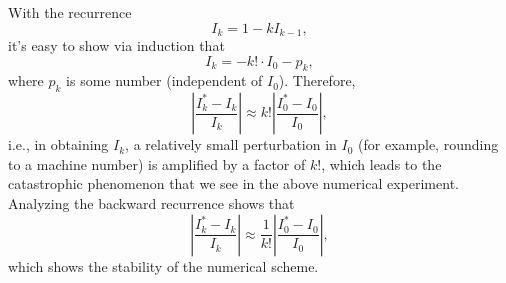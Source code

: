 \begin{multicols}{2}
\begin{sol}
    With the recurrence
    \begin{displaymath}
      I_k = 1 - kI_{k-1},
    \end{displaymath}
    it's easy to show via induction that
    \begin{displaymath}
      I_k = -k!\cdot I_0 - p_k,
    \end{displaymath}
    where $p_k$ is some number (independent of $I_0$).
    Therefore,
    \begin{displaymath}
      \left| \frac{I_k^{*} - I_k}{I_k}\right| \approx
        k! \left| \frac{I_0^{*}-I_0}{I_0}\right|,
    \end{displaymath}
    i.e., in obtaining $I_k$,
    a relatively small perturbation in $I_0$ (for example, rounding to a machine number)
    is amplified by a factor of $k!$,
    which leads to the catastrophic phenomenon that we see in the above numerical
    experiment.
    Analyzing the backward recurrence shows that
    \begin{displaymath}
      \left| \frac{I_k^{*} - I_k}{I_k}\right| \approx
        \frac{1}{k!} \left| \frac{I_0^{*}-I_0}{I_0}\right|,
      \end{displaymath}
      which shows the stability of the numerical scheme.
  \end{sol}
\end{multicols}

